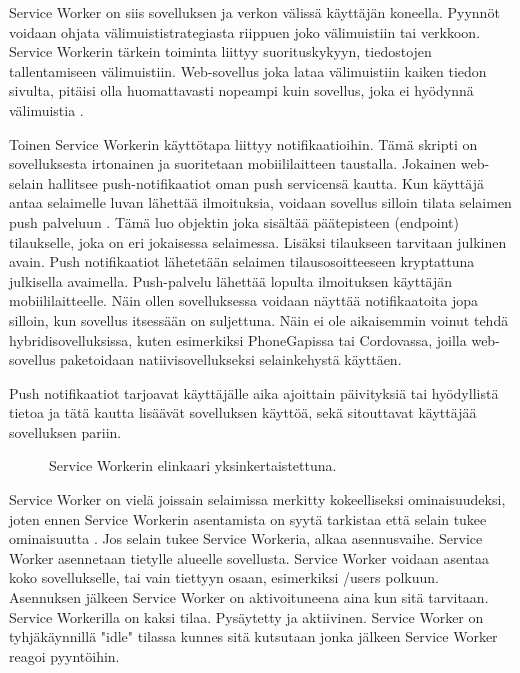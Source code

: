 \documentclass{tktltiki}
\begin{document}
Service Worker on siis sovelluksen ja verkon välissä käyttäjän koneella. Pyynnöt voidaan ohjata välimuististrategiasta riippuen joko välimuistiin tai verkkoon. Service Workerin tärkein toiminta liittyy suorituskykyyn, tiedostojen tallentamiseen välimuistiin. Web-sovellus joka lataa välimuistiin kaiken tiedon sivulta, pitäisi olla huomattavasti nopeampi kuin sovellus, joka ei hyödynnä välimuistia \cite{Walton}.

Toinen Service Workerin käyttötapa liittyy notifikaatioihin. Tämä skripti on sovelluksesta irtonainen ja suoritetaan mobiililaitteen taustalla. Jokainen web-selain hallitsee push-notifikaatiot oman push servicensä kautta. Kun käyttäjä antaa selaimelle luvan lähettää ilmoituksia, voidaan sovellus silloin tilata selaimen push palveluun \cite{Googleb}. Tämä luo objektin joka sisältää päätepisteen (endpoint) tilaukselle, joka on eri jokaisessa selaimessa. Lisäksi tilaukseen tarvitaan julkinen avain. Push notifikaatiot lähetetään selaimen tilausosoitteeseen kryptattuna julkisella avaimella. Push-palvelu lähettää lopulta ilmoituksen käyttäjän mobiililaitteelle. Näin ollen sovelluksessa voidaan näyttää notifikaatoita jopa silloin, kun sovellus itsessään on suljettuna. Näin ei ole aikaisemmin voinut tehdä hybridisovelluksissa, kuten esimerkiksi PhoneGapissa tai Cordovassa, joilla web-sovellus paketoidaan natiivisovellukseksi selainkehystä käyttäen.

Push notifikaatiot tarjoavat käyttäjälle aika ajoittain päivityksiä tai hyödyllistä tietoa ja tätä kautta lisäävät sovelluksen käyttöä, sekä sitouttavat käyttäjää sovelluksen pariin. \cite{8441701}

\begin{figure}[h]
\begin{center}
\caption{Service Workerin elinkaari yksinkertaistettuna. }
\label{Service workerin elinkaari}
\end{center}
\end{figure}
\clearpage

Service Worker on vielä joissain selaimissa merkitty kokeelliseksi ominaisuudeksi, joten ennen Service Workerin asentamista on syytä tarkistaa että selain tukee ominaisuutta \cite{hiltunen2018creating}. Jos selain tukee Service Workeria, alkaa asennusvaihe. Service Worker asennetaan tietylle alueelle sovellusta. Service Worker voidaan asentaa koko sovellukselle, tai vain tiettyyn osaan, esimerkiksi /users polkuun. Asennuksen jälkeen Service Worker on aktivoituneena aina kun sitä tarvitaan. Service Workerilla on kaksi tilaa. Pysäytetty ja aktiivinen. Service Worker on tyhjäkäynnillä "idle" tilassa kunnes sitä kutsutaan jonka jälkeen Service Worker reagoi pyyntöihin.  
\end{document}
